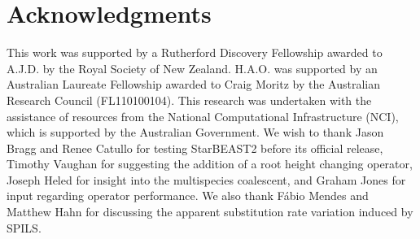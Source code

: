 \documentclass[nogrid]{MBE}%
\begin{document}
\section{Acknowledgments}

This work was supported by a Rutherford Discovery Fellowship awarded to A.J.D.
by the Royal Society of New Zealand. H.A.O. was supported by an Australian
Laureate Fellowship awarded to Craig Moritz by the Australian Research Council
(FL110100104). This research was undertaken with the assistance of resources
from the National Computational Infrastructure (NCI), which is supported by the
Australian Government. We wish to thank Jason Bragg and Renee Catullo for
testing StarBEAST2 before its official release, Timothy Vaughan for suggesting
the addition of a root height changing operator, Joseph Heled for insight into
the multispecies coalescent, and Graham Jones for input regarding operator
performance. We also thank F\'abio Mendes and Matthew Hahn for discussing the
apparent substitution rate variation induced by SPILS.

\end{document}
